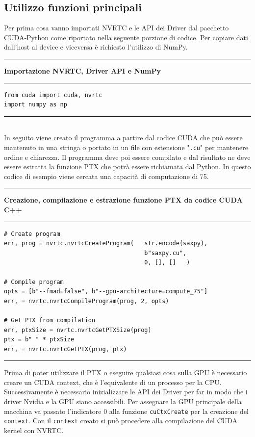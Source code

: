 \documentclass[12pt,a4paper]{report}
\begin{document}
\subsection{Utilizzo funzioni principali}
Per prima cosa vanno importati NVRTC e le API dei Driver dal pacchetto CUDA-Python come riportato nella seguente porzione di codice. Per copiare dati dall'host al device e viceversa è richiesto l'utilizzo di NumPy. \\[10pt]
\noindent\rule[0.5ex]{\linewidth}{2pt}
\small{\textbf{Importazione NVRTC, Driver API e NumPy}} \\
\noindent\rule[0.5ex]{\linewidth}{1pt}
\begin{lstlisting}
from cuda import cuda, nvrtc
import numpy as np
\end{lstlisting}
\noindent\rule[0.5ex]{\linewidth}{1pt} \\[10pt]
In seguito viene creato il programma a partire dal codice CUDA che può essere mantenuto in una stringa o portato in un file con estensione "\verb|.cu|" per mantenere ordine e chiarezza. Il programma deve poi essere compilato e dal risultato ne deve essere estratta la funzione PTX che potrà essere richiamata dal Python. In questo codice di esempio viene cercata una capacità di computazione di 75.   \\[10pt]
\noindent\rule[0.5ex]{\linewidth}{2pt}
\small{\textbf{Creazione, compilazione e estrazione funzione PTX da codice CUDA C++}} \\
\noindent\rule[0.5ex]{\linewidth}{1pt}
\begin{lstlisting}
# Create program
err, prog = nvrtc.nvrtcCreateProgram(   str.encode(saxpy), 
                                        b"saxpy.cu", 
                                        0, [], []   )

# Compile program 
opts = [b"--fmad=false", b"--gpu-architecture=compute_75"]
err, = nvrtc.nvrtcCompileProgram(prog, 2, opts)

# Get PTX from compilation
err, ptxSize = nvrtc.nvrtcGetPTXSize(prog)
ptx = b" " * ptxSize
err, = nvrtc.nvrtcGetPTX(prog, ptx)
\end{lstlisting}
\noindent\rule[0.5ex]{\linewidth}{1pt} \newpage
Prima di poter utilizzare il PTX o eseguire qualsiasi cosa sulla GPU è necessario creare un CUDA context, che è l'equivalente di un processo per la CPU. \newline
Successivamente è necessario inizializzare le API dei Driver per far in modo che i driver Nvidia e la GPU siano accessibili. Per assegnare la GPU principale della macchina va passato l'indicatore 0 alla funzione \verb|cuCtxCreate| per la creazione del \verb|context|. Con il \verb|context| creato si può procedere alla compilazione del CUDA kernel con NVRTC. \\[10pt]
\end{document}
